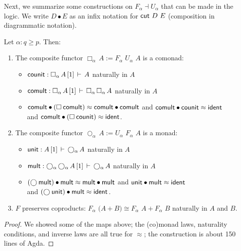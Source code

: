\documentclass{drl-common/llncs}
\newcommand{\la}{\ensuremath{\dashv}}
\newcommand\F[2]{\ensuremath{F_{#1} \,\, #2}}
\newcommand\U[2]{\ensuremath{U_{#1} \,\, #2}}
\newcommand\coprd[2]{\ensuremath{#1 + #2}}
\newcommand\seq[3]{\ensuremath{#1 \, [ #2 ] \, \vdash \, #3}}
\newcommand\ident[1]{\ensuremath{\dsd{ident}_{#1}}}
\newcommand\cutsym{\ensuremath{\dsd{cut}}}
\newcommand\cut[2]{\ensuremath{{\cutsym \,\, #1 \,\, #2}}}
\newcommand\cuti{\ensuremath{\bullet}}
\newcommand\ap[2]{\ensuremath{#1 \approx #2}}
\newcommand\Bx[2]{\ensuremath{\Box_{#1} \, {#2}}}
\newcommand\Crc[2]{\ensuremath{\bigcirc_{#1} \, {#2}}}
\newcommand\iso{\cong}
\begin{document}
Next, we summarize some constructions on $F_\alpha \la U_\alpha$ that
can be made in the logic. We write $D \cuti E$ as an infix notation for
\cut{D}{E} (composition in diagrammatic notation).

\begin{lemma} \label{lem:constructionsonadjunctions}
Let $\alpha : q \ge p$.  Then:
\begin{enumerate}
\item The composite functor $\Bx{\alpha}{A} := \F{\alpha}{\U{\alpha}{A}}$ is a comonad:
\begin{itemize}
\item[] $\dsd{counit} : \seq{\Bx \alpha A}{1}{A}$ naturally in $A$
\item[] $\dsd{comult} : \seq{\Bx \alpha A}{1}{\Bx \alpha {\Bx \alpha A}}$
  naturally in $A$
\item[] 
 \ap{\dsd{comult} \cuti (\Bx{}{\dsd{comult}})}{\dsd{comult} \cuti
   \dsd{comult}}
and \ap{\dsd{comult} \cuti \dsd{counit}}{\ident{}} \\
and \ap{\dsd{comult} \cuti (\Bx{}{\dsd{counit}})}{\ident{}}.  
\end{itemize}

\item The composite functor $\Crc{\alpha}{A} := \U{\alpha}{\F{\alpha}{A}}$ is a monad:
\begin{itemize}
\item[] $\dsd{unit} : \seq{A}{1}{\Crc \alpha A}$ naturally in $A$
\item[] $\dsd{mult} : \seq{\Crc \alpha {\Crc \alpha A}}{1}{\Crc \alpha A}$
  naturally in $A$
\item[] 
 \ap{(\Crc{}{\dsd{mult}}) \cuti \dsd{mult} }{\dsd{mult} \cuti
   \dsd{mult}}
and \ap{\dsd{unit} \cuti \dsd{mult}}{\ident{}} \\
and \ap{(\Crc{}{\dsd{unit}}) \cuti \dsd{mult}}{\ident{}}.  
\end{itemize}

\item $F$ preserves coproducts: $\F \alpha (\coprd A B) \iso \coprd {\F
  \alpha A} {\F \alpha B}$ naturally in $A$ and $B$.
\end{enumerate}
\end{lemma}

\begin{proof}
We showed some of the maps above; the (co)monad laws, naturality
conditions, and inverse laws are all true for \ap{}{}; the construction
is about 150 lines of Agda.
\end{proof}
\end{document}
